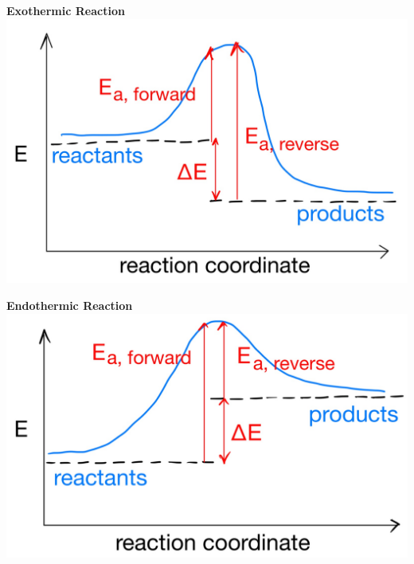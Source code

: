 \begin{minipage}{0.27\linewidth}
\begin{center}
    \textbf{Exothermic Reaction}
    \includegraphics[width = \linewidth]{images/exothermic reaction.jpeg}
\end{center}
\begin{center}
    \textbf{Endothermic Reaction}
    \includegraphics[width = \linewidth]{images/endothermic reaction.jpeg}
\end{center}   
\end{minipage}
